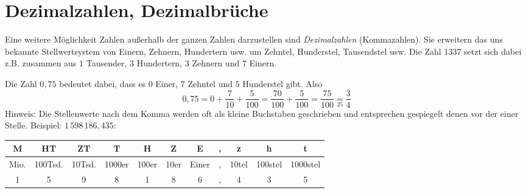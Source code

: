 \section{Dezimalzahlen, Dezimalbrüche}\vspace{-1em}
Eine weitere Möglichkeit Zahlen außerhalb der ganzen Zahlen darzustellen sind \emph{Dezimalzahlen} (Kommazahlen). Sie erweitern das uns bekannte Stellwertsystem von Einern, Zehnern, Hundertern usw. um Zehntel, Hunderstel, Tausendstel usw. Die Zahl 1337 setzt sich dabei z.B. zusammen aus $1$ Tausender, $3$ Hundertern, $3$ Zehnern und $7$ Einern.

Die Zahl $0{,}75$ bedeutet dabei, dass es $0$ Einer, $7$ Zehntel und $5$ Hunderstel gibt. Also 
\begin{equation*}
	0{,}75 = 0+\frac{7}{10}+\frac{5}{100}= \frac{70}{100}+\frac{5}{100}=\frac{75}{100}\underset{25}{=}\frac{3}{4}
\end{equation*}
Hinweis: Die Stellenwerte nach dem Komma werden oft als kleine Buchstaben geschrieben und entsprechen gespiegelt denen vor der einer Stelle. Beispiel: $1\, 598\, 186{,}435$:
\begin{center}
	\begin{tabular}{c|c|c|c|c|c|c|c|c|c|c}
		M & HT & ZT & T& H&Z&E&,&z&h&t\\ \hline
		Mio. & 100Tsd. & 10Tsd. & 1000er & 100er & 10er & Einer&, & 10tel & 100stel & 1000stel \\ \hline
		1&5&9&8&1&8&6&,&4&3&5
	\end{tabular}
\end{center}